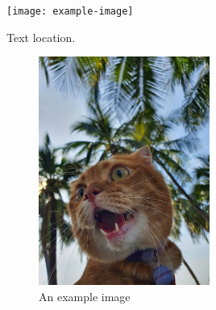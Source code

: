 \documentclass{article}
\begin{document}
\begin{center}
  \texttt{[image: example-image]}
\end{center}

\newpage
\lipsum[1-4] %

Text location.
\begin{figure}[ht] %
	\centering %
	\includegraphics[width=0.5\textwidth, angle=75, scale=0.5]{garfield.JPG}
	\caption{An example image}
\end{figure}

\lipsum[6-10] %

\newpage
\end{document}
